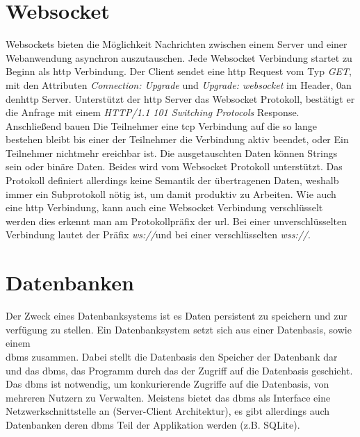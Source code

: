 \section{Websocket}
Websockets bieten die Möglichkeit Nachrichten zwischen einem Server und einer Webanwendung asynchron auszutauschen.
Jede Websocket Verbindung startet zu Beginn als \ac{http} Verbindung. 
Der Client sendet eine \ac{http} Request vom Typ \emph{GET},
mit den Attributen \emph{Connection: Upgrade} und \emph{Upgrade: websocket} im Header, 0an den\ac{http} Server.
Unterstützt der \ac{http} Server das Websocket Protokoll, 
bestätigt er die Anfrage mit einem \emph{HTTP/1.1 101 Switching Protocols} Response.
Anschließend bauen Die Teilnehmer eine \ac{tcp} Verbindung auf die so lange bestehen bleibt bis einer der Teilnehmer die Verbindung aktiv beendet, 
oder Ein Teilnehmer nichtmehr ereichbar ist.
Die ausgetauschten Daten können Strings sein oder binäre Daten. Beides wird vom Websocket Protokoll unterstützt.
Das Protokoll definiert allerdings keine Semantik der übertragenen Daten, 
weshalb immer ein Subprotokoll nötig ist, um damit produktiv zu Arbeiten.
Wie auch eine \ac{http} Verbindung, kann auch eine Websocket Verbindung verschlüsselt werden dies erkennt man am Protokollpräfix der \ac{url}.
Bei einer unverschlüsselten Verbindung lautet der Präfix \flqq \emph{ws://}\frqq{}und bei einer verschlüsselten \flqq \emph{wss://}\frqq.

\section{Datenbanken}
Der Zweck eines Datenbanksystems ist es Daten persistent zu speichern und zur verfügung zu stellen.
Ein Datenbanksystem setzt sich aus einer Datenbasis, sowie einem\\ \ac{dbms} zusammen.
Dabei stellt die Datenbasis den Speicher der Datenbank dar und das \ac{dbms}, 
das Programm durch das der Zugriff auf die Datenbasis geschieht.
Das \ac{dbms} ist notwendig, um konkurierende Zugriffe auf die Datenbasis, von mehreren Nutzern zu Verwalten. \citep{Schubert:2007:3}
Meistens bietet das \ac{dbms} als Interface eine Netzwerkschnittstelle an (Server-Client Architektur), es gibt allerdings auch Datenbanken deren \ac{dbms} Teil der Applikation werden (z.B. SQLite).
